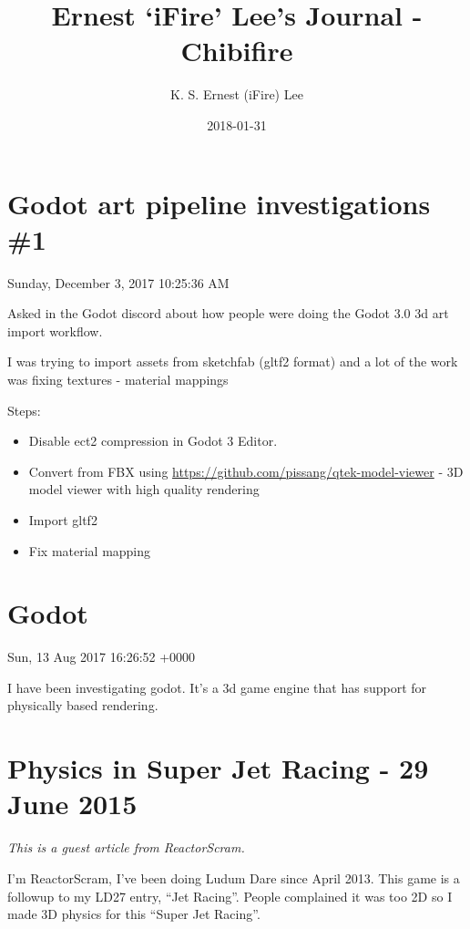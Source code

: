 \documentclass[]{book}
\title{Ernest `iFire' Lee's Journal - Chibifire}
\author{K. S. Ernest (iFire) Lee}
\date{2018-01-31}
\providecommand{\tightlist}{%
  \setlength{\itemsep}{0pt}\setlength{\parskip}{0pt}}
\begin{document}
\maketitle

{
\setcounter{tocdepth}{1}
\tableofcontents
}
\chapter{Godot art pipeline investigations
\#1}\label{godot-art-pipeline-investigations-1}

 Sunday, December 3, 2017 10:25:36 AM

Asked in the Godot discord about how people were doing the Godot 3.0 3d
art import workflow.

I was trying to import assets from sketchfab (gltf2 format) and a lot of
the work was fixing textures - material mappings

Steps:

\begin{itemize}
\tightlist
\item
  Disable ect2 compression in Godot 3 Editor.
\item
  Convert from FBX using
  \url{https://github.com/pissang/qtek-model-viewer} - 3D model viewer
  with high quality rendering
\item
  Import gltf2
\item
  Fix material mapping
\end{itemize}

\chapter{Godot}\label{godot}

 Sun, 13 Aug 2017 16:26:52 +0000

I have been investigating godot. It's a 3d game engine that has support
for physically based rendering.

\chapter{Physics in Super Jet Racing - 29 June
2015}\label{physics-in-super-jet-racing---29-june-2015}

\emph{This is a guest article from ReactorScram.}

I'm ReactorScram, I've been doing Ludum Dare since April 2013. This game
is a followup to my LD27 entry, ``Jet Racing''. People complained it was
too 2D so I made 3D physics for this ``Super Jet Racing''.
\end{document}
